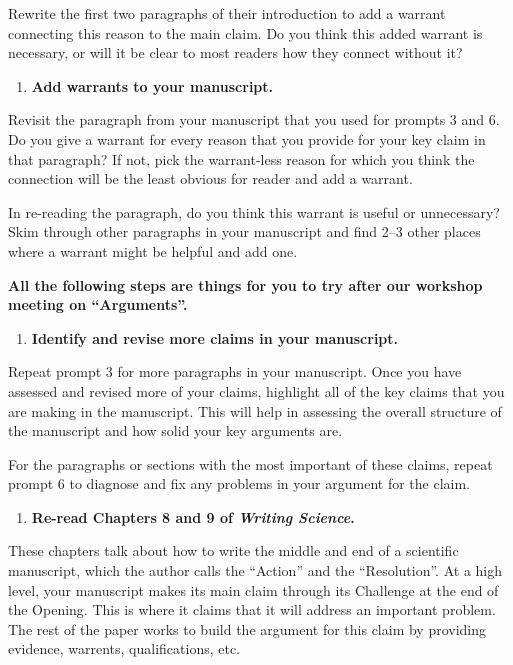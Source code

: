 \documentclass[]{tufte-book}
\providecommand{\tightlist}{%
  \setlength{\itemsep}{0pt}\setlength{\parskip}{0pt}}
\begin{document}
Rewrite the first two paragraphs of their introduction to add a warrant
connecting this reason to the main claim. Do you think this added warrant is
necessary, or will it be clear to most readers how they connect without it?

\begin{enumerate}
\def\labelenumi{\arabic{enumi}.}
\setcounter{enumi}{8}
\tightlist
\item
  \textbf{Add warrants to your manuscript.}
\end{enumerate}

Revisit the paragraph from your manuscript that you used for prompts 3 and 6.
Do you give a warrant for every reason that you provide for your key claim
in that paragraph? If not, pick the warrant-less reason for which you think the
connection will be the least obvious for reader and add a warrant.

In re-reading the paragraph, do you think this warrant is useful or unnecessary?
Skim through other paragraphs in your manuscript and find 2--3 other places
where a warrant might be helpful and add one.

\textbf{All the following steps are things for you to try after our workshop
meeting on ``Arguments''.}

\begin{enumerate}
\def\labelenumi{\arabic{enumi}.}
\setcounter{enumi}{9}
\tightlist
\item
  \textbf{Identify and revise more claims in your manuscript.}
\end{enumerate}

Repeat prompt 3 for more paragraphs in your manuscript. Once you have assessed
and revised more of your claims, highlight all of the key claims that you are
making in the manuscript. This will help in assessing the overall structure of
the manuscript and how solid your key arguments are.

For the paragraphs or sections with the most important of these claims, repeat
prompt 6 to diagnose and fix any problems in your argument for the claim.

\begin{enumerate}
\def\labelenumi{\arabic{enumi}.}
\setcounter{enumi}{10}
\tightlist
\item
  \textbf{Re-read Chapters 8 and 9 of \emph{Writing Science}.}
\end{enumerate}

These chapters talk about how to write the middle and end of a scientific
manuscript, which the author calls the ``Action'' and the ``Resolution''.
At a high level, your manuscript makes its main claim through its
Challenge at the end of the Opening. This is where it claims that
it will address an important problem. The rest of the paper works to
build the argument for this claim by providing evidence, warrents,
qualifications, etc.
\end{document}
